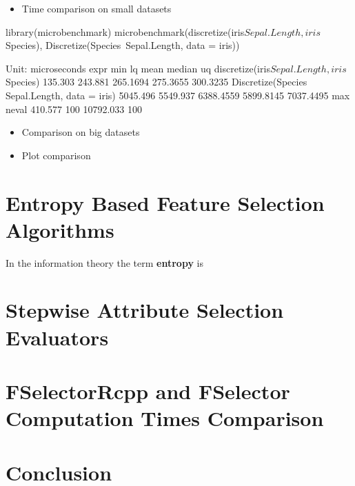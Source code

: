 \begin{itemize}
\tightlist
\item
  Time comparison on small datasets
\end{itemize}

\begin{Schunk}
\begin{Sinput}
library(microbenchmark)
microbenchmark(discretize(iris$Sepal.Length, iris$Species),
               Discretize(Species~Sepal.Length, data = iris))
\end{Sinput}
\begin{Soutput}
Unit: microseconds
                                            expr      min       lq      mean    median        uq
     discretize(iris$Sepal.Length, iris$Species)  135.303  243.881  265.1694  275.3655  300.3235
 Discretize(Species ~ Sepal.Length, data = iris) 5045.496 5549.937 6388.4559 5899.8145 7037.4495
       max neval
   410.577   100
 10792.033   100
\end{Soutput}
\end{Schunk}

\begin{itemize}
\item
  Comparison on big datasets
\item
  Plot comparison
\end{itemize}

\section{Entropy Based Feature Selection
Algorithms}\label{entropy-based-feature-selection-algorithms}

In the information theory the term \textbf{entropy}
\citep{Shannon:2001:MTC:584091.584093} is

\section{Stepwise Attribute Selection
Evaluators}\label{stepwise-attribute-selection-evaluators}

\section{FSelectorRcpp and FSelector Computation Times
Comparison}\label{fselectorrcpp-and-fselector-computation-times-comparison}

\section{Conclusion}\label{conclusion}

